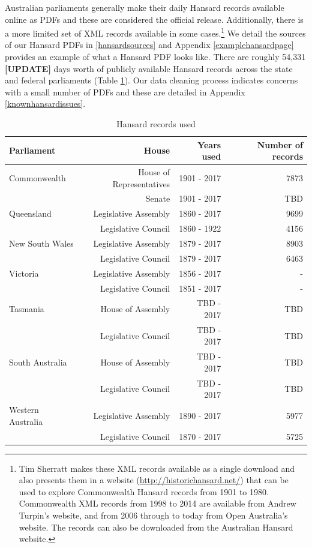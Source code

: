 \documentclass[12pt,]{article}
\theoremstyle{definition}
\theoremstyle{definition}
\theoremstyle{definition}
\theoremstyle{remark}
\begin{document}
Australian parliaments generally make their daily Hansard records
available online as PDFs and these are considered the official release.
Additionally, there is a more limited set of XML records available in
some cases.\footnote{Tim Sherratt makes these XML records available as a
  single download and also presents them in a website
  (\url{http://historichansard.net/}) that can be used to explore
  Commonwealth Hansard records from 1901 to 1980. Commonwealth XML
  records from 1998 to 2014 are available from Andrew Turpin's website,
  and from 2006 through to today from Open Australia's website. The
  records can also be downloaded from the Australian Hansard website.}
We detail the sources of our Hansard PDFs in \ref{hansardsources} and
Appendix \ref{examplehansardpage} provides an example of what a Hansard
PDF looks like. There are roughly 54,331 \textbf{{[}UPDATE{]}} days
worth of publicly available Hansard records across the state and federal
parliaments (Table \ref{tab:yearsusedtable}). Our data cleaning process
indicates concerns with a small number of PDFs and these are detailed in
Appendix \ref{knownhansardissues}.

\begin{table}

\caption{\label{tab:yearsusedtable}Hansard records used}
\centering
\fontsize{12}{14}\selectfont
\begin{tabular}[t]{lrrr}
\toprule
Parliament & House & Years used & Number of records\\
\midrule
Commonwealth & House of Representatives & 1901 - 2017 & 7873\\
 & Senate & 1901 - 2017 & TBD\\
Queensland & Legislative Assembly & 1860 - 2017 & 9699\\
 & Legislative Council & 1860 - 1922 & 4156\\
New South Wales & Legislative Assembly & 1879 - 2017 & 8903\\
\addlinespace
 & Legislative Council & 1879 - 2017 & 6463\\
Victoria & Legislative Assembly & 1856 - 2017 & -\\
 & Legislative Council & 1851 - 2017 & -\\
Tasmania & House of Assembly & TBD - 2017 & TBD\\
 & Legislative Council & TBD - 2017 & TBD\\
\addlinespace
South Australia & House of Assembly & TBD - 2017 & TBD\\
 & Legislative Council & TBD - 2017 & TBD\\
Western Australia & Legislative Assembly & 1890 - 2017 & 5977\\
 & Legislative Council & 1870 - 2017 & 5725\\
\bottomrule
\end{tabular}
\end{table}
\end{document}
